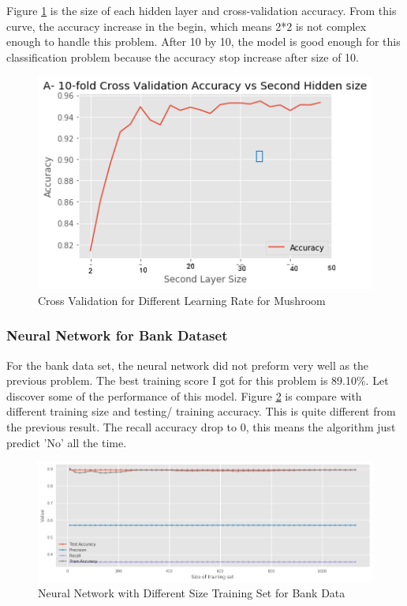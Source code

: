 \documentclass[10pt, conference, compsocconf]{IEEEtran}
\begin{document}
Figure \ref{fig:mush_nn_learing_layer} is the size of each hidden layer and cross-validation accuracy. From this curve, the accuracy increase in the begin, which means 2*2 is not complex enough to handle this problem. After 10 by 10, the model is good enough for this classification problem because the accuracy stop increase after size of 10. 

\begin{figure}[h]
	\centering
	\includegraphics[scale = 0.5]{image/mush_nn_layerSize.png}
	\caption{Cross Validation for Different Learning Rate for Mushroom}
	\label{fig:mush_nn_learing_layer}
\end{figure}
\subsubsection{Neural Network for Bank Dataset}
For the bank data set, the neural network did not preform very well as the previous problem. The best training score I got for this problem is 89.10\%. Let discover some of the performance of this model. Figure \ref{fig:bank_nn_learing} is compare with different training size and testing/ training accuracy. This is quite different from the previous result. The recall accuracy drop to 0, this means the algorithm just predict 'No' all the time. 

\begin{figure}[h]
	\centering
	\includegraphics[scale = 0.25]{image/bank_nn_learning.png}
	\caption{Neural Network with Different Size Training Set for Bank Data}
	\label{fig:bank_nn_learing}
\end{figure}
\end{document}
